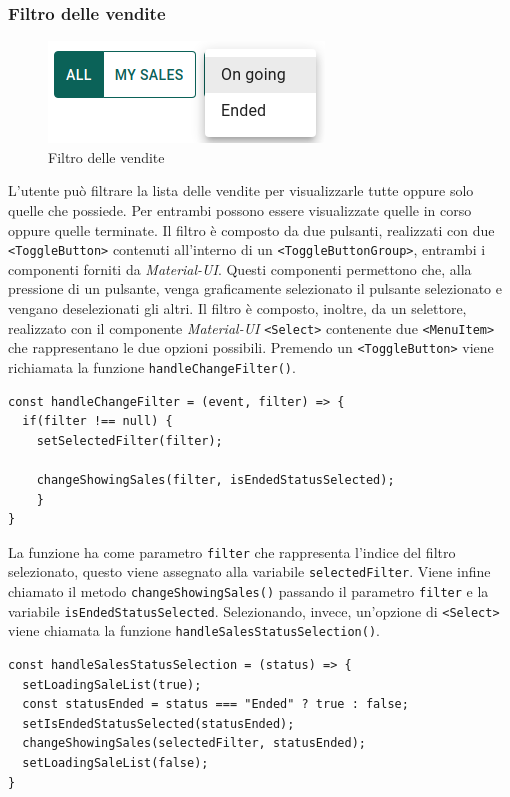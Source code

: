 \documentclass[a4paper]{article}
\begin{document}
        \subsubsection{Filtro delle vendite}
        \begin{figure}[ht]
          \includegraphics[scale=0.7, fbox]{saleFilter.png}
          \centering
          \caption{Filtro delle vendite}
          \centering
          \label{fig:salesFilter}
        \end{figure}
        L'utente può filtrare la lista delle vendite per visualizzarle tutte oppure solo quelle che possiede. Per entrambi possono essere visualizzate quelle in corso oppure quelle terminate.
        Il filtro è composto da due pulsanti, realizzati con due \verb|<ToggleButton>| contenuti all'interno di un \verb|<ToggleButtonGroup>|, entrambi i componenti forniti da \emph{Material-UI}. Questi componenti permettono che, alla pressione di un pulsante, venga graficamente selezionato il pulsante selezionato e vengano deselezionati gli altri.
        Il filtro è composto, inoltre, da un selettore, realizzato con il componente \emph{Material-UI} \verb|<Select>| contenente due \verb|<MenuItem>| che rappresentano le due opzioni possibili.
        Premendo un \verb|<ToggleButton>| viene richiamata la funzione \verb|handleChangeFilter()|.
\begin{lstlisting}[style=ES6, title={Funzione handleChangeFilter()}]
const handleChangeFilter = (event, filter) => {
  if(filter !== null) { 
    setSelectedFilter(filter);

    changeShowingSales(filter, isEndedStatusSelected);
    }
}\end{lstlisting}
        La funzione ha come parametro \verb|filter| che rappresenta l'indice del filtro selezionato, questo viene assegnato alla variabile \verb|selectedFilter|.
        Viene infine chiamato il metodo \verb|changeShowingSales()| passando il parametro \verb|filter| e la variabile \verb|isEndedStatusSelected|.
        \newline
        Selezionando, invece, un'opzione di \verb|<Select>| viene chiamata la funzione \verb|handleSalesStatusSelection()|.
\begin{lstlisting}[style=ES6, title={Funzione handleSalesStatusSelection()}]
const handleSalesStatusSelection = (status) => {
  setLoadingSaleList(true);
  const statusEnded = status === "Ended" ? true : false;
  setIsEndedStatusSelected(statusEnded);
  changeShowingSales(selectedFilter, statusEnded);
  setLoadingSaleList(false);
}\end{lstlisting}
\end{document}
